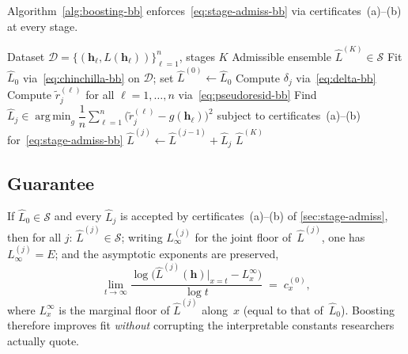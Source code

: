 \documentclass[11pt]{article}
\newcommand{\calD}{\mathcal{D}}
\newcommand{\calS}{\mathcal{S}}
\newcommand{\Lhat}{\hat{L}}
\DeclareMathOperator*{\argmin}{arg\,min}
\begin{document}
Algorithm~\ref{alg:boosting-bb} enforces~\eqref{eq:stage-admiss-bb} via certificates~(a)--(b) at every stage.
\begin{algorithm}[H]
\caption{Shape-constrained boosted symbolic regression}
\label{alg:boosting-bb}
\begin{algorithmic}[1]
\Require Dataset $\calD = \{(\mathbf{h}_\ell, L(\mathbf{h}_\ell))\}_{\ell=1}^{n}$,
         stages $K$
\Ensure Admissible ensemble $\Lhat^{(K)} \in \calS$
\State Fit $\Lhat_0$ via~\eqref{eq:chinchilla-bb} on $\calD$;
       set $\Lhat^{(0)} \gets \Lhat_0$
    \State Compute $\delta_j$ via~\eqref{eq:delta-bb}
    \State Compute $\tilde{r}_j^{(\ell)}$ for all $\ell=1,\ldots,n$
           via~\eqref{eq:pseudoresid-bb}
    \State Find
           $\Lhat_j \in \argmin_{g}
           \dfrac{1}{n}\sum_{\ell=1}^{n}\bigl(\tilde{r}_j^{(\ell)} - g(\mathbf{h}_\ell)\bigr)^2$
           subject to certificates~(a)--(b) for~\eqref{eq:stage-admiss-bb}
    \State $\Lhat^{(j)} \gets \Lhat^{(j-1)} + \Lhat_j$
\EndFor
\State \Return $\Lhat^{(K)}$
\end{algorithmic}
\end{algorithm}

\subsection{Guarantee}\label{sec:guarantee}
If $\Lhat_0 \in \calS$ and every $\Lhat_j$ is accepted by certificates~(a)--(b) of \cref{sec:stage-admiss}, then for all $j$: $\Lhat^{(j)} \in \calS$; writing $L_\infty^{(j)}$ for the joint floor of~$\Lhat^{(j)}$, one has $L_\infty^{(j)} = E$; and the asymptotic exponents are preserved,
\begin{equation}\label{eq:guarantee-bb}
    \lim_{t \to \infty}
    \frac{\log\bigl(\Lhat^{(j)}(\mathbf{h})\big|_{x=t}
        - L^{\infty}_{x}\bigr)}{\log t}
    \;=\; c_x^{(0)},
\end{equation}
where $L^{\infty}_{x}$ is the marginal floor of $\Lhat^{(j)}$ along~$x$ (equal to that of~$\Lhat_0$). Boosting therefore improves fit \emph{without} corrupting the interpretable constants researchers actually quote.
\end{document}
